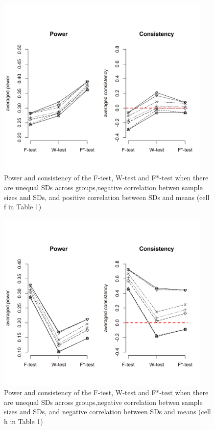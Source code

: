 \documentclass[man,floatsintext]{apa6}
\begin{document}
\begin{figure}
\includegraphics[width=400px]{Rmarkdown folder/Rmarkdown inputs/Fig2f} \caption{Power and consistency of the F-test, W-test and F*-test when there are unequal SDs across groups,negative correlation betwen sample sizes and SDs, and positive correlation between SDs and means (cell f in Table 1)}\label{fig:unnamed-chunk-11}
\end{figure}

\begin{figure}
\includegraphics[width=400px]{Rmarkdown folder/Rmarkdown inputs/Fig2g} \caption{Power and consistency of the F-test, W-test and F*-test when there are unequal SDs across groups,negative correlation betwen sample sizes and SDs, and negative correlation between SDs and means (cell h in Table 1)}\label{fig:unnamed-chunk-12}
\end{figure}
\end{document}
